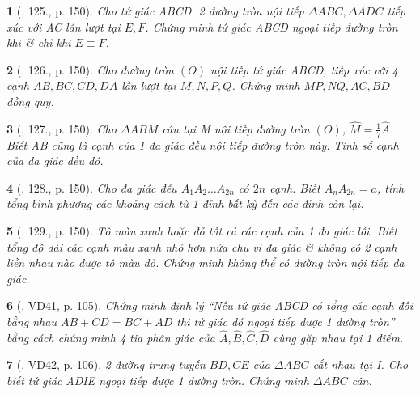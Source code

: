 \documentclass{article}
\newtheorem{baitoan}{}
\begin{document}
\begin{baitoan}[\cite{Tuyen_Toan_9_old}, 125., p. 150]
	Cho tứ giác ABCD. 2 đường tròn nội tiếp $\Delta ABC,\Delta ADC$ tiếp xúc với AC lần lượt tại $E,F$. Chứng minh tứ giác ABCD ngoại tiếp đường tròn khi \& chỉ khi $E\equiv F$.
\end{baitoan}

\begin{baitoan}[\cite{Tuyen_Toan_9_old}, 126., p. 150]
	Cho đường tròn $(O)$ nội tiếp tứ giác ABCD, tiếp xúc với 4 cạnh $AB,BC,CD,DA$ lần lượt tại $M,N,P,Q$. Chứng minh $MP,NQ,AC,BD$ đồng quy.
\end{baitoan}

\begin{baitoan}[\cite{Tuyen_Toan_9_old}, 127., p. 150]
	Cho $\Delta ABM$ cân tại M nội tiếp đường tròn $(O)$, $\widehat{M} = \frac{1}{7}\widehat{A}$. Biết AB cũng là cạnh của 1 đa giác đều nội tiếp đường tròn này. Tính số cạnh của đa giác đều đó.
\end{baitoan}

\begin{baitoan}[\cite{Tuyen_Toan_9_old}, 128., p. 150]
	Cho đa giác đều $A_1A_2\ldots A_{2n}$ có $2n$ cạnh. Biết $A_nA_{2n} = a$, tính tổng bình phương các khoảng cách từ 1 đỉnh bất kỳ đến các đỉnh còn lại.
\end{baitoan}

\begin{baitoan}[\cite{Tuyen_Toan_9_old}, 129., p. 150]
	Tô màu xanh hoặc đỏ tất cả các cạnh của 1 đa giác lồi. Biết tổng độ dài các cạnh màu xanh nhỏ hơn nửa chu vi đa giác \& không có 2 cạnh liền nhau nào được tô màu đỏ. Chứng minh không thể có đường tròn nội tiếp đa giác.
\end{baitoan}

\begin{baitoan}[\cite{Binh_Toan_9_tap_2}, VD41, p. 105]
	Chứng minh định lý ``Nếu tứ giác ABCD có tổng các cạnh đối bằng nhau $AB + CD = BC + AD$ thì tứ giác đó ngoại tiếp được 1 đường tròn'' bằng cách chứng minh 4 tia phân giác của $\widehat{A},\widehat{B},\widehat{C},\widehat{D}$ cùng gặp nhau tại 1 điểm.
\end{baitoan}

\begin{baitoan}[\cite{Binh_Toan_9_tap_2}, VD42, p. 106]
	2 đường trung tuyến $BD,CE$ của $\Delta ABC$ cắt nhau tại I. Cho biết tứ giác ADIE ngoại tiếp được 1 đường tròn. Chứng minh $\Delta ABC$ cân.
\end{baitoan}
\end{document}
